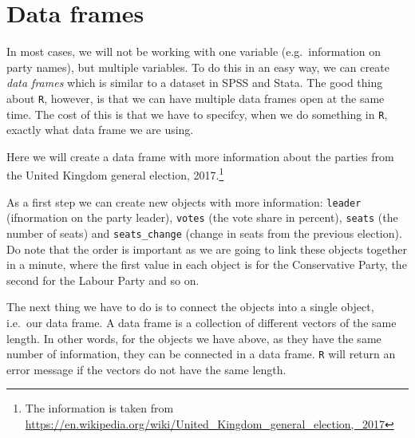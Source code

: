 \documentclass[12pt,oneside]{reedthesis}
\theoremstyle{definition}
\theoremstyle{definition}
\theoremstyle{definition}
\theoremstyle{remark}
\begin{document}
  \section{Data frames}\label{data-frames}
  
  In most cases, we will not be working with one variable
  (e.g.~information on party names), but multiple variables. To do this in
  an easy way, we can create \emph{data frames} which is similar to a
  dataset in SPSS and Stata. The good thing about \texttt{R}, however, is
  that we can have multiple data frames open at the same time. The cost of
  this is that we have to specifcy, when we do something in \texttt{R},
  exactly what data frame we are using.
  
  Here we will create a data frame with more information about the parties
  from the United Kingdom general election, 2017.\footnote{The information
    is taken from
    \url{https://en.wikipedia.org/wiki/United_Kingdom_general_election,_2017}}
  
  As a first step we can create new objects with more information:
  \texttt{leader} (ifnormation on the party leader), \texttt{votes} (the
  vote share in percent), \texttt{seats} (the number of seats) and
  \texttt{seats\_change} (change in seats from the previous election). Do
  note that the order is important as we are going to link these objects
  together in a minute, where the first value in each object is for the
  Conservative Party, the second for the Labour Party and so on.
  \begin{Shaded}
  \begin{Highlighting}[]
  \StringTok{ }\NormalTok{(}\NormalTok{, }\NormalTok{, }\NormalTok{, }
              \NormalTok{, }\NormalTok{, }\NormalTok{)}
  \StringTok{ }\NormalTok{(}\NormalTok{, }\NormalTok{, }\NormalTok{, }\NormalTok{, }\NormalTok{, }\NormalTok{)}
  \StringTok{ }\NormalTok{(}\NormalTok{, }\NormalTok{, }\NormalTok{, }\NormalTok{, }\NormalTok{, }\NormalTok{)}
  \StringTok{ }\NormalTok{(}\OperatorTok{-}\NormalTok{, }\NormalTok{, }\OperatorTok{-}\NormalTok{, }\NormalTok{, }\NormalTok{, }\NormalTok{)}
  \end{Highlighting}
  \end{Shaded}
  The next thing we have to do is to connect the objects into a single
  object, i.e.~our data frame. A data frame is a collection of different
  vectors of the same length. In other words, for the objects we have
  above, as they have the same number of information, they can be
  connected in a data frame. \texttt{R} will return an error message if
  the vectors do not have the same length.
  
\end{document}
